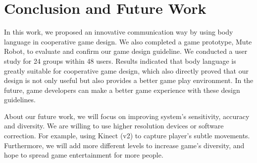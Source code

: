 \documentclass{sigchi}
\begin{document}

\section{Conclusion and Future Work}

In this work, we proposed an innovative communication way by using body language in cooperative game design. We also completed a game prototype, Mute Robot, to evaluate and confirm our game design guideline. We conducted a user study for 24 groups within 48 users. Results indicated that body language is greatly suitable for cooperative game design, which also directly proved that our design is not only useful but also provides a better game play environment. In the future, game developers can make a better game experience with these design guidelines. 

About our future work, we will focus on improving system's sensitivity, accuracy and diversity. We are willing to use higher resolution devices or software correction. For example, using Kinect (v2) to capture player's subtle movements. Furthermore, 
we will add more different levels to increase game's diversity, and hope to spread game entertainment for more people.

\balance




\end{document}
